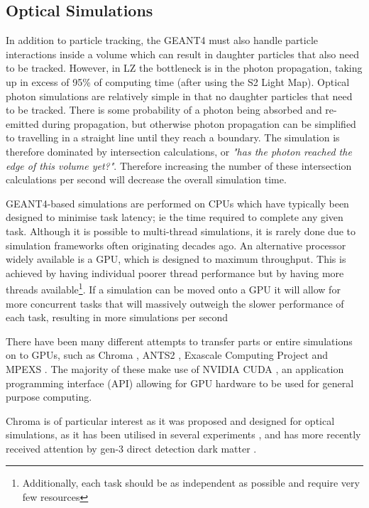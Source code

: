 \subsection{Optical Simulations}
\par
In addition to particle tracking, the GEANT4 must also handle particle interactions inside a volume which can result in daughter particles that also need to be tracked.
However, in LZ the bottleneck is in the photon propagation, taking up in excess of 95\% of computing time (after using the S2 Light Map).
Optical photon simulations are relatively simple in that no daughter particles that need to be tracked.
There is some probability of a photon being absorbed and re-emitted during propagation, but otherwise photon propagation can be simplified to travelling in a straight line until they reach a boundary.
The simulation is therefore dominated by intersection calculations, or \textit{"has the photon reached the edge of this volume yet?"}.
Therefore increasing the number of these intersection calculations per second will decrease the overall simulation time.
\par
GEANT4-based simulations are performed on CPUs which have typically been designed to minimise task latency; ie the time required to complete any given task.
Although it is possible to multi-thread simulations, it is rarely done due to simulation frameworks often originating decades ago.
An alternative processor widely available is a GPU, which is designed to maximum throughput.
This is achieved by having individual poorer thread performance but by having more threads available\footnote{Additionally, each task should be as independent as possible and require very few resources}.
If a simulation can be moved onto a GPU it will allow for more concurrent tasks that will massively outweigh the slower performance of each task, resulting in more simulations per second
\par
There have been many different attempts to transfer parts or entire simulations on to GPUs, such as Chroma \cite{chroma_whitepaper_ref}, ANTS2 \cite{ants2_whitepaper_ref}, Exascale Computing Project \cite{ExaSMR_whitepaper_ref} and MPEXS \cite{mpexs_whitepaper_ref}.
The majority of these make use of NVIDIA CUDA \cite{cuda_ref}, an application programming interface (API) allowing for GPU hardware to be used for general purpose computing.
\par
Chroma is of particular interest as it was proposed and designed for optical simulations, as it has been utilised in several experiments \cite{chroma_with_tpcs1_ref,chroma_with_tpcs2_ref,chroma_with_tpcs3_ref}, and has more recently received attention by gen-3 direct detection dark matter \cite{DARWIN_GPU_simulations_2022_ref}.
